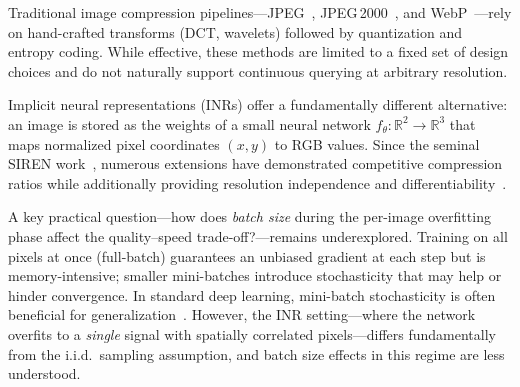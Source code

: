 \documentclass[a4paper,oneside,11pt,english]{scrartcl}
\begin{document}
Traditional image compression pipelines---JPEG~\cite{wallace1992jpeg},
JPEG\,2000~\cite{taubman2002jpeg2000}, and WebP~\cite{google2010webp}---rely
on hand-crafted transforms (DCT, wavelets) followed by quantization and
entropy coding.  While effective, these methods are limited to a fixed set
of design choices and do not naturally support continuous querying at arbitrary
resolution.

Implicit neural representations (INRs) offer a fundamentally different
alternative: an image is stored as the weights of a small neural network
$f_\theta\colon \mathbb{R}^2 \to \mathbb{R}^3$ that maps normalized pixel
coordinates $(x,y)$ to RGB values.  Since the seminal SIREN
work~\cite{sitzmann2020siren}, numerous extensions have demonstrated
competitive compression ratios while additionally providing resolution
independence and differentiability~\cite{dupont2021coin, dupont2022coinpp,
strumpler2022implicit}.

A key practical question---how does \emph{batch size} during the per-image
overfitting phase affect the quality--speed trade-off?---remains underexplored.
Training on all pixels at once (full-batch) guarantees an unbiased gradient at
each step but is memory-intensive; smaller mini-batches introduce stochasticity
that may help or hinder convergence.  In standard deep learning, mini-batch
stochasticity is often beneficial for generalization~\cite{keskar2017largebatch}.
However, the INR setting---where the network overfits to a \emph{single}
signal with spatially correlated pixels---differs fundamentally from the
i.i.d.\ sampling assumption, and batch size effects in this regime are less
understood.
\end{document}
